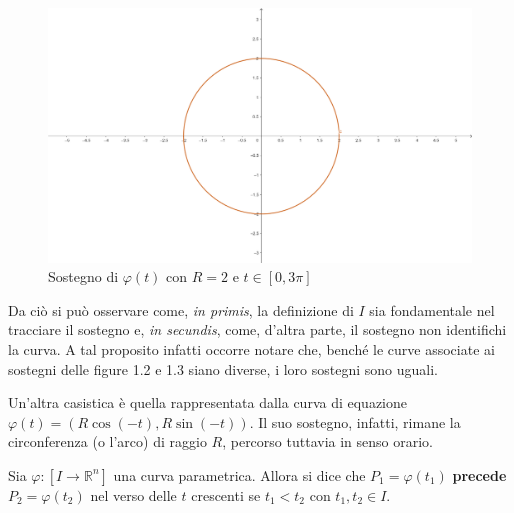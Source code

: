 \begin{example}
\begin{figure}[H]
\begin{minipage}{0.25\textwidth}
        \includegraphics[width=\textwidth]{Capitoli/Capitolo1/sostegno_circ3.png}
        \caption{Sostegno di $\varphi(t)$ con $R=2$ e $t\in[0, 3\pi]$}
    \end{minipage}
\end{figure}
\end{example}
Da ciò si può osservare come, \textit{in primis}, la definizione di $I$ sia fondamentale nel tracciare il sostegno e, \textit{in secundis}, come, d'altra parte, il sostegno non identifichi la curva. A tal proposito infatti occorre notare che, benché le curve associate ai sostegni delle figure 1.2 e 1.3 siano diverse, i loro sostegni sono uguali.
\begin{example}    
    Un'altra casistica è quella rappresentata dalla curva di equazione $\varphi(t)=(R \cos(-t), R \sin(-t))$. Il suo sostegno, infatti, rimane la circonferenza (o l'arco) di raggio $R$, percorso tuttavia in senso orario.
\end{example}
\begin{definition}
    Sia $\varphi:[I \to \mathbb{R}^n]$ una curva parametrica. Allora si dice che $P_1=\varphi(t_1)$ \textbf{precede} $P_2=\varphi(t_2)$ nel verso delle $t$ crescenti se $t_1<t_2$ con $t_1, t_2 \in I$.
\end{definition}
